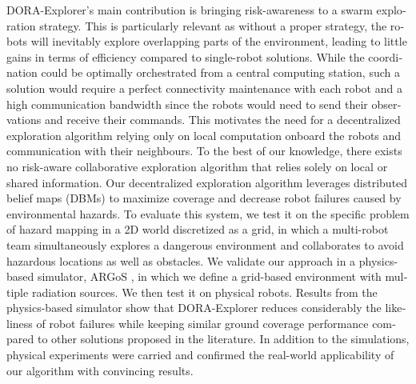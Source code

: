 \begin{otherlanguage}{english}
DORA-Explorer's main contribution is bringing risk-awareness to a swarm exploration strategy. This is particularly relevant as without a proper strategy, the robots
will inevitably explore overlapping parts of the environment, leading
to little gains in terms of efficiency compared to single-robot
solutions. While the coordination could be optimally orchestrated from
a central computing station, such a solution would require a perfect
connectivity maintenance with each robot and a high communication
bandwidth since the robots would need to send their observations and
receive their commands. This motivates the need for a decentralized
exploration algorithm relying only on local computation onboard the
robots and communication with their neighbours. To the best of our knowledge, there exists no risk-aware collaborative exploration algorithm that relies solely on local or shared
information. Our decentralized exploration algorithm leverages distributed belief maps (DBMs) to maximize coverage and decrease robot failures caused by environmental hazards. To evaluate this system, we test it on the specific problem of
hazard mapping in a 2D world discretized as a grid, in which a
multi-robot team simultaneously explores a dangerous environment and
collaborates to avoid hazardous locations as well as obstacles. We validate our approach in a physics-based simulator, ARGoS
\cite{Pinciroli:SI2012}, in which we define a grid-based environment
with multiple radiation sources. We then test it on physical
robots. Results from the physics-based simulator show that DORA-Explorer reduces considerably the likeliness of robot failures while keeping similar ground coverage performance compared to other solutions proposed in the literature. In addition to the simulations, physical experiments were carried and confirmed the real-world applicability of our algorithm with convincing results. 


\end{otherlanguage}
